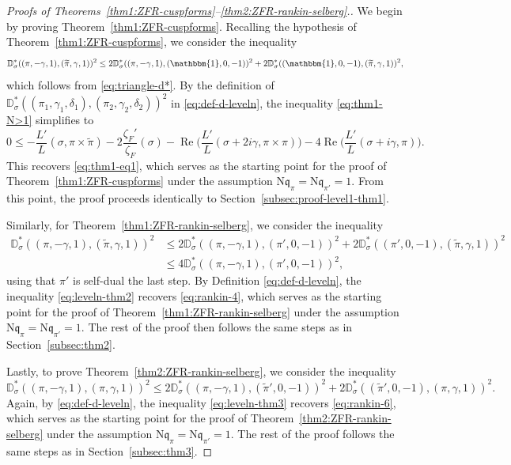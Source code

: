 \documentclass[12pt,reqno]{amsart}
\renewcommand{\tilde}{\widetilde}
\theoremstyle{remark}
\renewcommand{\tilde}{\widetilde}
\DeclareMathOperator{\Real}{Re}
\renewcommand{\tilde}{\widetilde}
\newcommand{\N}{\mathrm{N}}
\newcommand{\kq}{\mathfrak{q}}
\numberwithin{equation}{section}
\begin{document}
\begin{proof}[Proofs of Theorems~\ref{thm1:ZFR-cuspforms}--\ref{thm2:ZFR-rankin-selberg}.]
We begin by proving Theorem~\ref{thm1:ZFR-cuspforms}. Recalling the hypothesis of Theorem~\ref{thm1:ZFR-cuspforms}, we consider the inequality
\begin{equation}\label{eq:thm1-N>1}
\mathbb{D}^*_{\sigma}((\pi,-\gamma,1), (\tilde{\pi},\gamma,1))^2 \le 2\mathbb{D}^*_{\sigma}((\pi,-\gamma,1), (\mathbbm{1},0,-1))^2 + 2\mathbb{D}^*_{\sigma}((\mathbbm{1},0,-1), (\tilde{\pi},\gamma,1))^2,
\end{equation}
which follows from \eqref{eq:triangle-d*}.
By the definition of $\mathbb{D}^*_{\sigma} ((\pi_1,\gamma_1,\delta_1), (\pi_2,\gamma_2,\delta_2))^2$ in \eqref{eq:def-d-leveln}, the inequality \eqref{eq:thm1-N>1} simplifies to
\begin{equation*}
		0 \le -\frac{L'}{L}(\sigma, \pi\times \tilde{\pi})-2\frac{\zeta_F'}{\zeta_F}(\sigma) -\Real\Big(\frac{L'}{L}(\sigma+2i\gamma, \pi \times \pi)\Big)-4\Real\Big(\frac{L'}{L}(\sigma+i\gamma, \pi)\Big).
\end{equation*}
This recovers \eqref{eq:thm1-eq1}, which serves as the starting point for the proof of Theorem~\ref{thm1:ZFR-cuspforms} under the assumption $\N\kq_{\pi}=\N\kq_{\pi'}=1$. 
From this point, the proof proceeds identically to Section~\ref{subsec:proof-level1-thm1}.

Similarly, for Theorem~\ref{thm1:ZFR-rankin-selberg}, we consider the inequality
\begin{equation}\label{eq:leveln-thm2}
\begin{aligned}
\mathbb{D}^*_{\sigma}((\pi,-\gamma,1), (\tilde{\pi},\gamma,1))^2 &\le 2\mathbb{D}^*_{\sigma}((\pi,-\gamma,1), (\pi',0,-1))^2 + 2\mathbb{D}^*_{\sigma}((\pi',0,-1), (\tilde{\pi},\gamma,1))^2\\
&\le 4\mathbb{D}^*_{\sigma}((\pi,-\gamma, 1), (\pi',0,-1))^2,
\end{aligned}
\end{equation}
using that $\pi'$ is self-dual the last step.
By Definition \eqref{eq:def-d-leveln}, the inequality \eqref{eq:leveln-thm2} recovers \eqref{eq:rankin-4}, which serves as the starting point for the proof of Theorem~\ref{thm1:ZFR-rankin-selberg} under the assumption 
$\N\kq_{\pi}=\N\kq_{\pi'}=1$.  The rest of the proof then follows the same steps as in Section~\ref{subsec:thm2}.

Lastly, to prove Theorem~\ref{thm2:ZFR-rankin-selberg}, we consider the inequality 
\begin{equation}\label{eq:leveln-thm3}
\mathbb{D}^*_{\sigma}((\pi,-\gamma,1), (\pi,\gamma,1))^2 \le 2\mathbb{D}^*_{\sigma}((\pi,-\gamma,1), (\tilde{\pi}',0,-1))^2 + 2\mathbb{D}^*_{\sigma}((\tilde{\pi}',0,-1), (\pi,\gamma,1))^2.    
\end{equation}
Again, by \eqref{eq:def-d-leveln}, the inequality \eqref{eq:leveln-thm3} recovers \eqref{eq:rankin-6}, which serves as the starting point for the proof of Theorem~\ref{thm2:ZFR-rankin-selberg} under the assumption
$\N\kq_{\pi}=\N\kq_{\pi'}=1$. The rest of the proof follows the same steps as in Section~\ref{subsec:thm3}.
\end{proof}
\end{document}

